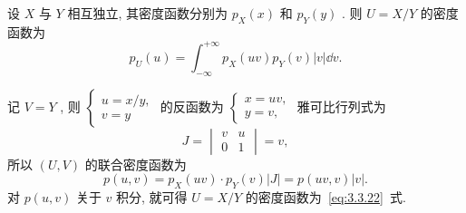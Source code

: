       \begin{example}[(商的公式)]\label{exam:3.3.11}
      	设 $X$ 与 $Y$ 相互独立, 其密度函数分别为 $p_{X}(x)$ 和 $p_{Y}(y)$ . 则 $U=X/Y$ 的密度函数为
      	\begin{equation}\label{eq:3.3.22}
      		p_{U}(u)=\int_{-\infty}^{+\infty}p_{X}(uv)p_{Y}(v)|v|\dd v.
      	\end{equation}
      	\begin{solution}
      		记 $V=Y$ , 则 $\begin{cases}
      		u=x/y,\\
      		v=y
      		\end{cases}$ 的反函数为
      		$\begin{cases}
      		x=uv,\\
      		y=v,
      		\end{cases}$ 雅可比行列式为
      		\begin{equation*}
      			J=\begin{vmatrix}
      			v & u\\
      			0 & 1
      			\end{vmatrix}=v,
      		\end{equation*}
      		所以 $(U,V)$ 的联合密度函数为
      		\begin{equation*}
      			p(u,v)=p_{X}(uv)\cdot p_{Y}(v)|J|=p(uv,v)|v|.
      		\end{equation*}
      		对 $p(u,v)$ 关于 $v$ 积分, 就可得 $U=X/Y$ 的密度函数为~\eqref{eq:3.3.22}~式.
      	\end{solution}
      \end{example}
